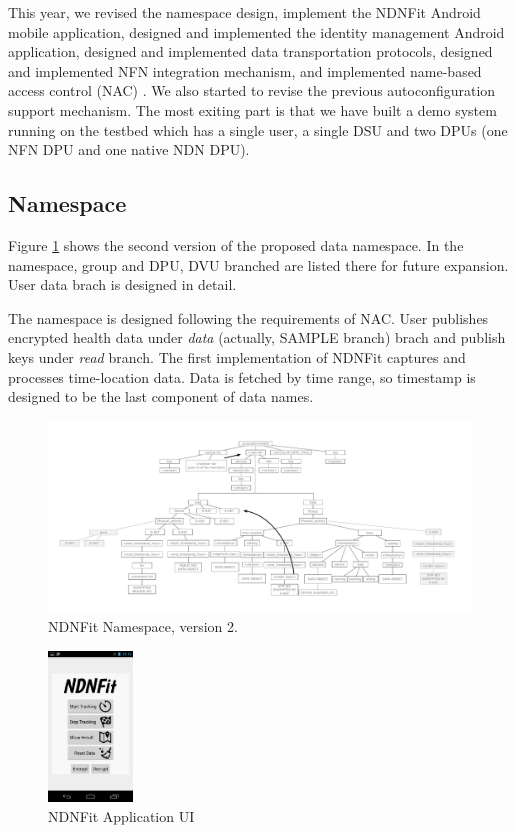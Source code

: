 \documentclass{article}
\begin{document}
This year, we revised the namespace design, implement the NDNFit Android mobile application, designed and implemented the identity management Android application, designed and implemented data transportation protocols, designed and implemented NFN integration mechanism, and implemented name-based access control (NAC) \cite{yu2015name}. We also started to revise the previous autoconfiguration support mechanism. The most exiting part is that we have built a demo system running on the testbed which has a single user, a single DSU and two DPUs (one NFN DPU and one native NDN DPU).

\subsection{Namespace}

Figure \ref{fig:namespace} shows the second version of the proposed data namespace. In the namespace, group and DPU, DVU branched are listed there for future expansion. User data brach is designed in detail.

The namespace is designed following the requirements of NAC. User publishes encrypted health data under \textit{data} (actually, SAMPLE branch) brach and publish keys under \textit{read} branch. The first implementation of NDNFit captures and processes time-location data. Data is fetched by time range, so timestamp is designed to be the last component of data names.

\begin{figure}
	\begin{center}
		\includegraphics[width=1\textwidth]{namespace3.pdf}
		\caption{NDNFit Namespace, version 2.}
		\label{fig:namespace}
	\end{center}
\end{figure}

\begin{figure}
	\begin{center}
		\includegraphics[width=0.2\textwidth]{NDNFit.png}
		\caption{NDNFit Application UI}
		\label{fig:ndnfit}
	\end{center}
\end{figure}
\end{document}
